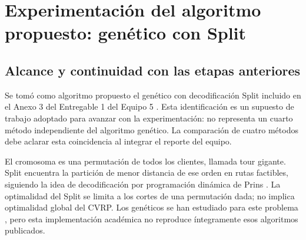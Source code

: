 \section{Experimentación del algoritmo propuesto: genético con Split}
\subsection{Alcance y continuidad con las etapas anteriores}
Se tomó como algoritmo propuesto el genético con decodificación Split incluido en
el Anexo 3 del Entregable 1 del Equipo 5 \cite{equipo2026}. Esta identificación es un supuesto de
trabajo adoptado para avanzar con la experimentación: no representa un cuarto
método independiente del algoritmo genético. La comparación de cuatro métodos
debe aclarar esta coincidencia al integrar el reporte del equipo.

El cromosoma es una permutación de todos los clientes, llamada tour gigante.
Split encuentra la partición de menor distancia de ese orden en rutas factibles,
siguiendo la idea de decodificación por programación dinámica de Prins
\cite{prins2004}. La optimalidad del Split se limita a los cortes de una
permutación dada; no implica optimalidad global del CVRP. Los genéticos se han
estudiado para este problema \cite{baker2003}, pero esta implementación académica
no reproduce íntegramente esos algoritmos publicados.

